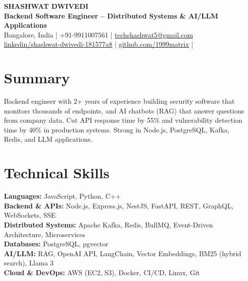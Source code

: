 \documentclass[10pt,letterpaper]{article}
\begin{document}
\begin{center}
    {\LARGE \textbf{SHASHWAT DWIVEDI}} \\[1pt]
    \textbf{Backend Software Engineer -- Distributed Systems \& AI/LLM Applications} \\[3pt]

    Bangalore, India
    \;|\;
    +91-9911007561
    \;|\;
    \href{mailto:techshashwat5@gmail.com}{techshashwat5@gmail.com} \\[1pt]
    \href{https://linkedin.com/in/shashwat-dwivedi-181577a8}{linkedin/shashwat-dwivedi-181577a8}
    \;|\;
    \href{https://github.com/1999matrix}{github.com/1999matrix}
    \;|\;
  
\end{center}

\vspace{-5pt}

\section{Summary}
Backend engineer with 2+ years of experience building security software that monitors thousands of endpoints, and AI chatbots (RAG) that answer questions from company data. Cut API response time by 55\% and vulnerability detection time by 40\% in production systems. Strong in Node.js, PostgreSQL, Kafka, Redis, and LLM applications.

\section{Technical Skills}

\textbf{Languages:} JavaScript, Python, C++ \\[1pt]
\textbf{Backend \& APIs:} Node.js, Express.js, NestJS, FastAPI, REST, GraphQL, WebSockets, SSE \\[1pt]
\textbf{Distributed Systems:} Apache Kafka, Redis, BullMQ, Event-Driven Architecture, Microservices \\[1pt]
\textbf{Databases:} PostgreSQL, pgvector \\[1pt]
\textbf{AI/LLM:} RAG, OpenAI API, LangChain, Vector Embeddings, BM25 (hybrid search), Llama 3 \\[1pt]
\textbf{Cloud \& DevOps:} AWS (EC2, S3), Docker, CI/CD, Linux, Git

\end{document}

